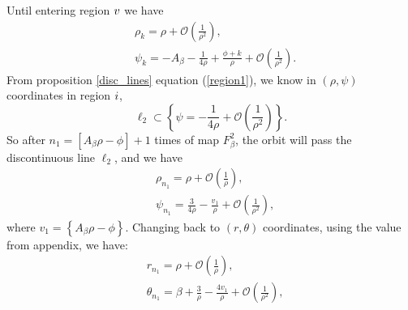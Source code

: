\documentclass{article}
\def \Rone{\uppercase\expandafter{\romannumeral1}}
\def \Rfive{\uppercase\expandafter{\romannumeral5}}
\numberwithin{figure}{section}
\numberwithin{equation}{section}
\theoremstyle{remark}
\theoremstyle{definition}
\begin{document}
Until entering region $\Rfive$ we have 
\begin{align*}
	&\rho_k=\rho+\mathcal{O}\left(\frac{1}{\rho^2}\right),\\
	&\psi_k=-A_\beta-\frac{1}{4\rho}+\frac{\phi+k}{\rho}+\mathcal{O}\left(\frac{1}{\rho^2}\right).
\end{align*}
From proposition \ref*{disc_lines} equation (\ref*{region1}), we know in $(\rho,\psi)$ coordinates in region $\Rone$, 
$$\ell_{2}\subset\left\{\psi=-\frac{1}{4\rho}+\mathcal{O}\left(\frac{1}{\rho^2}\right)\right\}.$$
So after $n_1=\left[A_\beta\rho-\phi\right]+1$ times of map $F_\beta^2$, the orbit will pass the discontinuous line $\ell_2$, and we have 
\begin{equation}
	\begin{split}
		&\rho_{n_1}=\rho+\mathcal{O}\left(\frac{1}{\rho}\right),\\
		&\psi_{n_1}=\frac{3}{4\rho}-\frac{v_1}{\rho}+\mathcal{O}\left(\frac{1}{\rho^2}\right),
	\end{split}
\end{equation}
where $v_1=\left\{A_\beta\rho-\phi\right\}$. Changing back to $(r,\theta)$ coordinates, using the value from appendix, we have:
\begin{equation}
	\begin{split}
		&r_{n_1}=\rho+\mathcal{O}\left(\frac{1}{\rho}\right),\\
		&\theta_{n_1}=\beta+\frac{3}{\rho}-\frac{4v_1}{\rho}+\mathcal{O}\left(\frac{1}{\rho^2}\right),
	\end{split}
\end{equation}
\end{document}
